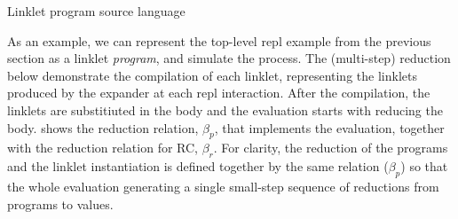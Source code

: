 			\begin{figure-here}
				\begin{todo}
					Linklet program source language
				\end{todo}


			\end{figure-here}


			\begin{paragraph-here}
				As an example, we can represent the top-level repl example from the
				previous section as a linklet \emph{program}, and simulate the
				process. The (multi-step) reduction below demonstrate the compilation of each
				linklet, representing the linklets produced by the expander at each
				repl interaction. After the compilation, the linklets are substitiuted
				in the body and the evaluation starts with reducing the
				body.  shows the reduction relation, $\beta_p$, that
				implements the evaluation, together with the reduction relation for
				RC, $\beta_r$. For clarity, the reduction of the programs and the linklet
				instantiation is defined together by the same relation ($\beta_p$) so that
				the whole evaluation generating a single small-step sequence of
				reductions from programs to values.
			\end{paragraph-here}


